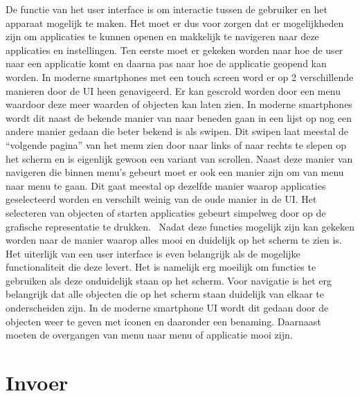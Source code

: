 De functie van het user interface is om interactie tussen de gebruiker en het apparaat mogelijk te maken. Het moet er dus voor zorgen dat er mogelijkheden zijn om applicaties te kunnen openen en makkelijk te navigeren naar deze applicaties en instellingen. Ten eerste moet er gekeken worden naar hoe de user naar een applicatie komt en daarna pas naar hoe de applicatie geopend kan worden. In moderne smartphones met een touch screen word er op 2 verschillende manieren door de UI heen genavigeerd. Er kan gescrold worden door een menu waardoor deze meer waarden of objecten kan laten zien. In moderne smartphones wordt dit naast de bekende manier van naar beneden gaan in een lijst op nog een andere manier gedaan die beter bekend is als swipen. Dit swipen laat meestal de “volgende pagina” van het menu zien door naar links of naar rechts te slepen op het scherm en is eigenlijk gewoon een variant van scrollen. Naast deze manier van navigeren die binnen menu’s gebeurt moet er ook een manier zijn om van menu naar menu te gaan. Dit gaat meestal op dezelfde manier waarop applicaties geselecteerd worden en verschilt weinig van de oude manier in de UI. Het selecteren van objecten of starten applicaties gebeurt simpelweg door op de grafische representatie te drukken.  Nadat deze functies mogelijk zijn kan gekeken worden naar de manier waarop alles mooi en duidelijk op het scherm te zien is. Het uiterlijk van een user interface is even belangrijk als de mogelijke functionaliteit die deze levert. Het is namelijk erg moeilijk om functies te gebruiken als deze onduidelijk staan op het scherm. Voor navigatie is het erg belangrijk dat alle objecten die op het scherm staan duidelijk van elkaar te onderscheiden zijn. In de moderne smartphone UI wordt dit gedaan door de objecten weer te geven met iconen en daaronder een benaming. Daarnaast moeten de overgangen van menu naar menu of applicatie mooi zijn. 

\section{Invoer}

